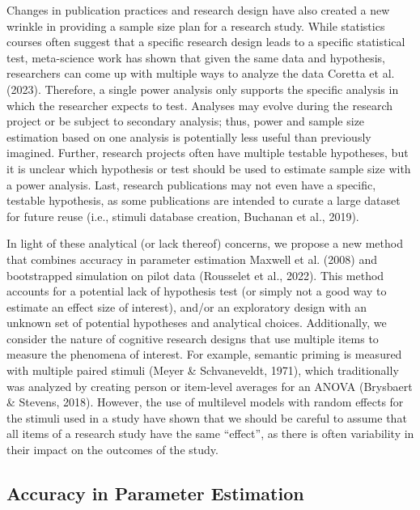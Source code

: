 \documentclass[
  man]{apa7}
\begin{document}
Changes in publication practices and research design have also created a new wrinkle in providing a sample size plan for a research study. While statistics courses often suggest that a specific research design leads to a specific statistical test, meta-science work has shown that given the same data and hypothesis, researchers can come up with multiple ways to analyze the data Coretta et al. (2023). Therefore, a single power analysis only supports the specific analysis in which the researcher expects to test. Analyses may evolve during the research project or be subject to secondary analysis; thus, power and sample size estimation based on one analysis is potentially less useful than previously imagined. Further, research projects often have multiple testable hypotheses, but it is unclear which hypothesis or test should be used to estimate sample size with a power analysis. Last, research publications may not even have a specific, testable hypothesis, as some publications are intended to curate a large dataset for future reuse (i.e., stimuli database creation, Buchanan et al., 2019).

In light of these analytical (or lack thereof) concerns, we propose a new method that combines accuracy in parameter estimation Maxwell et al. (2008) and bootstrapped simulation on pilot data (Rousselet et al., 2022). This method accounts for a potential lack of hypothesis test (or simply not a good way to estimate an effect size of interest), and/or an exploratory design with an unknown set of potential hypotheses and analytical choices. Additionally, we consider the nature of cognitive research designs that use multiple items to measure the phenomena of interest. For example, semantic priming is measured with multiple paired stimuli (Meyer \& Schvaneveldt, 1971), which traditionally was analyzed by creating person or item-level averages for an ANOVA (Brysbaert \& Stevens, 2018). However, the use of multilevel models with random effects for the stimuli used in a study have shown that we should be careful to assume that all items of a research study have the same ``effect'', as there is often variability in their impact on the outcomes of the study.

\hypertarget{accuracy-in-parameter-estimation}{%
\subsection{Accuracy in Parameter Estimation}\label{accuracy-in-parameter-estimation}}
\end{document}
